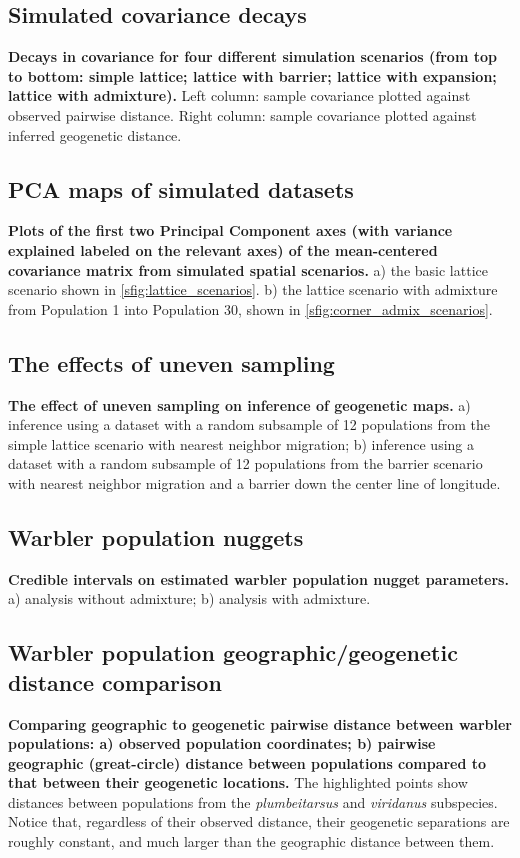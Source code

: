 \documentclass[10pt,letterpaper]{article}
\begin{document}
\subsection*{Simulated covariance decays}
\label{sim_covariance_decays}
{\bf{Decays in covariance for four different simulation scenarios (from top to bottom: simple lattice; lattice with barrier; lattice with expansion; lattice with admixture).} } Left column: sample covariance plotted against observed pairwise distance.  Right column: sample covariance plotted against inferred geogenetic distance.

\subsection*{PCA maps of simulated datasets}
\label{sim_pc_maps}
{\bf{Plots of the first two Principal Component axes (with variance explained labeled on the relevant axes)
			of the mean-centered covariance matrix from simulated spatial scenarios.}}
			a) the basic lattice scenario shown in \ref{sfig:lattice_scenarios}.
			b) the lattice scenario with admixture from Population 1 into Population 30, 
				shown in \ref{sfig:corner_admix_scenarios}.

\subsection*{The effects of uneven sampling}
\label{uneven_sampling}
{\bf{The effect of uneven sampling on inference of geogenetic maps.}}
a) inference using a dataset with a random subsample of 12 populations from the simple lattice scenario with nearest neighbor migration; b) inference using a dataset with a random subsample of 12 populations from the barrier scenario with nearest neighbor migration and a barrier down the center line of longitude.

\subsection*{Warbler population nuggets}
\label{warb_pop_nugg}
{\bf{Credible intervals on estimated warbler population nugget parameters.}} a) analysis without admixture; b) analysis with admixture.

\subsection*{Warbler population geographic/geogenetic distance comparison}
\label{warb_pop_distcomp}
{\bf{Comparing geographic to geogenetic pairwise distance between warbler populations: a) observed population coordinates; b) pairwise geographic (great-circle) distance between populations compared to that between their geogenetic locations.}} The highlighted points show distances between populations from the \textit{plumbeitarsus} and \textit{viridanus} subspecies.  Notice that, regardless of their observed distance, their geogenetic separations are roughly constant, and much larger than the geographic distance between them.
\end{document}

